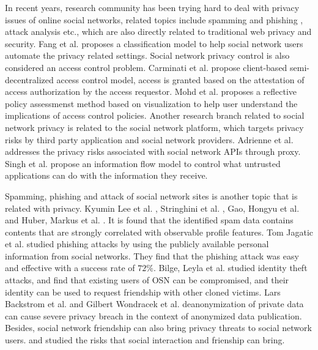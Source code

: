 \documentclass[a4paper]{article}
\begin{document}
In recent years, research community has been trying hard to deal with
privacy issues of online social networks, related topics include
spamming and phishing \cite{twitter-spam, SN-explore-spam,
SN-automated-cheap-spam, social-spam-detection, video-spam-youtube},
attack analysis \cite{neighborhood-attack, 1658958,
group-deanonymization-attack, anony-link-attack,
identity-theft-attack, sybil-attack, 1608132} etc., which are also
directly related to traditional web privacy and security. Fang et
al. \cite{privacy-wizard} proposes a classification model to help
social network users automate the privacy related settings. Social
network privacy control is also considered an access control
problem. Carminati et al. \cite{crypto-collaborative-ac,
rule-based-ac} propose client-based semi-decentralized access control
model, access is granted based on the attestation of access
authorization by the access requestor. Mohd et
al. \cite{Anwar_visualizingprivacy} proposes a reflective policy
assessmenst method based on visualization to help user understand the
implications of access control policies. Another research branch
related to social network privacy is related to the social network
platform, which targets privacy risks by third party application and
social network providers. Adrienne et
al. \cite{Felt08privacyprotection} addresses the privacy risks
associated with social network APIs through proxy. Singh et
al. \cite{xbook-social-platform} propose an information flow model to
control what untrusted applications can do with the information they
receive.

Spamming, phishing and attack of social network sites is another topic
that is related with
privacy. Kyumin Lee et al. \cite{social-spammer-machine-learning},
Stringhini et al. \cite{SN-detect-spam}, Gao, Hongyu et
al. \cite{SN-spam-campaigns} and Huber, Markus et
al. \cite{SN-explore-spam}. It is found that the
identified spam data contains contents that are strongly correlated
with observable profile features. Tom Jagatic et al. \cite{social-phishing}
studied phishing attacks by using the publicly available personal
information from social networks. They find that the phishing attack
was easy and effective with a success rate of $72\%$. Bilge, Leyla et
al.\cite{identity-theft-attack} studied identity
theft attacks, and find that existing users of OSN can be
compromised, and their identity can be used to request friendship with
other cloned victims. Lars Backstrom et al. \cite{anony-link-attack}
and Gilbert Wondracek et al. \cite{group-deanonymization-attack}
deanonymization of private data can cause severe privacy breach in the
context of anonymized data publication. Besides, social network
friendship can also bring privacy threats to social network
users. \cite{user-interaction-social-link} and
\cite{neighborhood-attack} studied the risks that social interaction
and frienship can bring.
\end{document}
